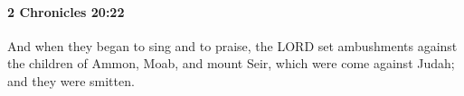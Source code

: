 
		\paragraph{2 Chronicles 20:22} %
			\label{2CHRONICLES-20-22}

			And when they began to sing and to praise, the LORD set ambushments against the children of Ammon, Moab, and mount Seir, which were come against Judah; and they were smitten.


